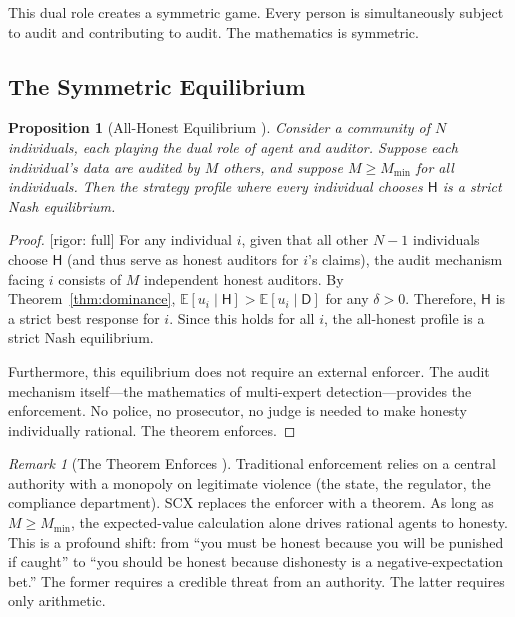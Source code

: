 \documentclass[11pt,a4paper]{article}
\newtheorem{proposition}[theorem]{Proposition}
\theoremstyle{definition}
\theoremstyle{remark}
\newtheorem{remark}[theorem]{Remark}
\newcommand{\rigorFull}{\textcolor{green!60!black}{[rigor: full]}}
\newcommand{\SCX}{\textsc{SCX}}
\newcommand{\E}{\mathbb{E}}
\newcommand{\honest}{\mathsf{H}}
\newcommand{\dishonest}{\mathsf{D}}
\newcommand{\deception}{\delta}
\begin{document}
This dual role creates a symmetric game. Every person is simultaneously subject to audit and contributing to audit. The mathematics is symmetric.

\subsection{The Symmetric Equilibrium }

\begin{proposition}[All-Honest Equilibrium ]
\label{prop:equilibrium}
Consider a community of $N$ individuals, each playing the dual role of agent and auditor. Suppose each individual's data are audited by $M$ others, and suppose $M \geq M_{\min}$ for all individuals. Then the strategy profile where every individual chooses $\honest$ is a strict Nash equilibrium.
\end{proposition}

\begin{proof}\rigorFull
For any individual $i$, given that all other $N-1$ individuals choose $\honest$ (and thus serve as honest auditors for $i$'s claims), the audit mechanism facing $i$ consists of $M$ independent honest auditors. By Theorem~\ref{thm:dominance}, $\E[u_i \mid \honest] > \E[u_i \mid \dishonest]$ for any $\deception > 0$. Therefore, $\honest$ is a strict best response for $i$. Since this holds for all $i$, the all-honest profile is a strict Nash equilibrium.

Furthermore, this equilibrium does not require an external enforcer. The audit mechanism itself---the mathematics of multi-expert detection---provides the enforcement. No police, no prosecutor, no judge is needed to make honesty individually rational. The theorem enforces.
\end{proof}

\begin{remark}[The Theorem Enforces ]
\label{rem:theorem_enforces}
Traditional enforcement relies on a central authority with a monopoly on legitimate violence (the state, the regulator, the compliance department). \SCX{} replaces the enforcer with a theorem. As long as $M \geq M_{\min}$, the expected-value calculation alone drives rational agents to honesty. This is a profound shift: from ``you must be honest because you will be punished if caught'' to ``you should be honest because dishonesty is a negative-expectation bet.'' The former requires a credible threat from an authority. The latter requires only arithmetic.
\end{remark}
\end{document}
